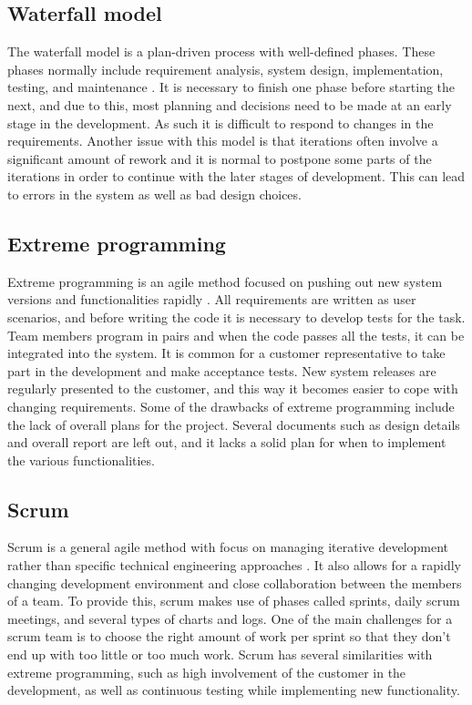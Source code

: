 \subsection{Waterfall model}
The waterfall model is a plan-driven process with well-defined phases. These phases normally include requirement analysis, system design, implementation, testing, and maintenance \cite[p.30-32]{Sommerville}. It is necessary to finish one phase before starting the next, and due to this, most planning and decisions need to be made at an early stage in the development. As such it is difficult to respond to changes in the requirements. Another issue with this model is that iterations often involve a significant amount of rework and it is normal to postpone some parts of the iterations in order to continue with the later stages of development. This can lead to errors in the system as well as bad design choices.

\subsection{Extreme programming}
Extreme programming is an agile method focused on pushing out new system versions and functionalities rapidly \cite[p.64-72]{Sommerville}. All requirements are written as user scenarios, and before writing the code it is necessary to develop tests for the task. Team members program  in pairs and when the code passes all the tests, it can be integrated into the system.  It is common for a customer representative to take part in the development and make acceptance tests. New system releases are regularly presented to the customer, and this way it becomes easier to cope with changing requirements. Some of the drawbacks of extreme programming include the lack of overall plans for the project. Several documents such as design details and overall report are left out, and it lacks a solid plan for when to implement the various functionalities.


\subsection{Scrum }
\label{sec:scrum}
Scrum is a general agile method with focus on managing iterative development rather than specific technical engineering approaches \cite[p.72-74]{Sommerville}. It also allows for a rapidly changing development environment and close collaboration between the members of a team. To provide this, scrum makes use of phases called sprints, daily scrum meetings, and several types of charts and logs. One of the main challenges for a scrum team is to choose the right amount of work per sprint so that they don’t end up with too little or too much work. Scrum has several similarities with extreme programming, such as high involvement of the customer in the development, as well as continuous testing while implementing new functionality.

